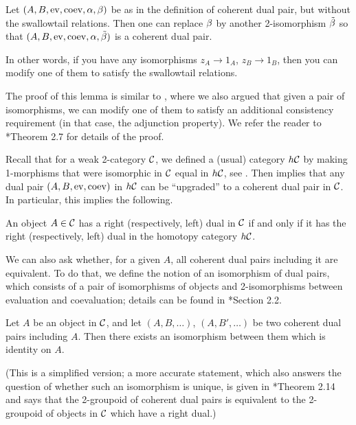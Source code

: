 \begin{lemma}\label{l:dual-pair-upgrade}
  Let $(A, B, \operatorname{ev}, \operatorname{coev}, \alpha, \beta)$ be as in the definition of
  coherent dual pair, but without the swallowtail relations.
  Then one can replace $\beta$ by another
  2-isomorphism $\tilde {\beta}$ so that
  $(A, B, \operatorname{ev}, \operatorname{coev}, \alpha, \tilde {\beta})$ is a coherent dual pair.
\end{lemma}

In other words, if you have any isomorphisms $z_A\to 1_A$, $z_B\to 1_B$,
then you can modify one of them to satisfy the swallowtail relations.

The proof of this lemma is similar to , where
we also argued that given a pair of isomorphisms, we can modify one of them
to satisfy an additional consistency requirement (in that case, the adjunction
property). We refer the reader to *{Theorem 2.7} for
details of the proof.

Recall that for a weak 2-category $\mathcal{C}$, we defined a (usual) category
$h\mathcal{C}$ by making 1-morphisms that were isomorphic in $\mathcal{C}$ equal in
$h\mathcal{C}$, see . Then  implies that
any dual pair $(A,B, \operatorname{ev}, \operatorname{coev})$ in $h\mathcal{C}$ can be ``upgraded'' to a
coherent dual pair in $\mathcal{C}$. In particular, this implies the following.

\begin{corollary}\label{c:dual-objects-2cat}
  An object $A\in \mathcal{C}$ has a right \textup{(}respectively, left\textup{)} dual in $\mathcal{C}$
  if and only if it has the right \textup{(}respectively, left\textup{)}
  dual in the homotopy category $h\mathcal{C}$.
\end{corollary}

We can also ask whether, for a given $A$, all coherent dual pairs
including it are equivalent. To do that, we define the notion of
an isomorphism of dual pairs, which consists of a pair of isomorphisms of
objects and 2-isomorphisms between evaluation and coevaluation; details
can be found in *{Section 2.2}.


\begin{theorem}\label{t:coh-dual-pair-unique}
    Let $A$ be an object in $\mathcal{C}$, and let $(A,B, \dots)$,
    $(A, B', \dots)$ be two coherent dual pairs including $A$.
    Then there exists an isomorphism between them which is identity on $A$.
\end{theorem}

(This is a simplified version; a more accurate statement, which also
answers the question of whether such an isomorphism is unique, is given
in *{Theorem 2.14} and says that the 2-groupoid of
coherent dual pairs is equivalent to the 2-groupoid of
objects in $\mathcal{C}$ which have a right dual.)

